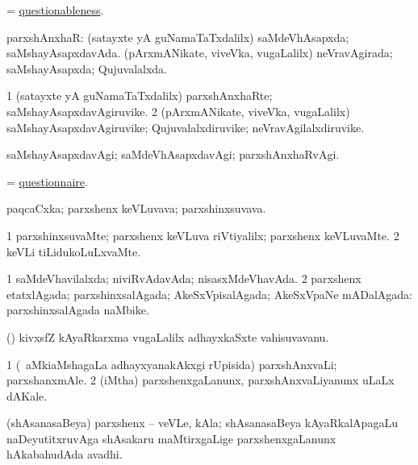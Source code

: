 \bentry
{}
\gl{\nA}
\bmng
= \hyperlink{questionableness}{questionableness}. 
\emng
\eentry

\bentry
{}
\gl{\gu}
\bmng
parxshAnxhaR: 
\banum
{} (satayxte yA guNamaTaTxdalilx) saMdeVhAsapxda; saMshayAsapxdavAda. 
 (pArxmANikate, viveVka, \mo vugaLalilx) neVravAgirada; saMshayAsapxda; Qujuvalalxda. 
\eanum
\emng
\eentry

\bentry
{}
\gl{\nA}
\bmng
\bnum
\num{1} (satayxte yA guNamaTaTxdalilx) parxshAnxhaRte; saMshayAsapxdavAgiruvike. 
\num{2} (pArxmANikate, viveVka, \mo vugaLalilx) saMshayAsapxdavAgiruvike; Qujuvalalxdiruvike; neVravAgilalxdiruvike. 
\enum
\emng
\eentry

\bentry
{}
\gl{\kirxvi}
\bmng
saMshayAsapxdavAgi; saMdeVhAsapxdavAgi; parxshAnxhaRvAgi. 
\emng
\eentry

\bentry
{}
\gl{\nA}
\bmng
= \hyperlink{questionnaire}{questionnaire}. 
\emng
\eentry

\bentry
{}
\gl{\nA}
\bmng
paqcaCxka; parxshenx keVLuvava; parxshinxsuvava. 
\emng
\eentry

\bentry
{}
\gl{\kirxvi}
\bmng
\bnum
\num{1} parxshinxsuvaMte; parxshenx keVLuva riVtiyalilx; parxshenx keVLuvaMte. 
\num{2} keVLi tiLidukoLuLxvaMte. 
\enum
\emng
\eentry

\bentry
{}
\gl{\gu}
\bmng
\bnum
\num{1} saMdeVhavilalxda; niviRvAdavAda; nisasxMdeVhavAda. 
\num{2} parxshenx etatxlAgada; parxshinxsalAgada; AkeSxVpisalAgada; AkeSxVpaNe mADalAgada:   parxshinxsalAgada naMbike. 
\enum
\emng
\eentry

\bentry
{}
\gl{\nA}
\bmng
(\birx) kivxsfZ kAyaRkarxma \mo vugaLalilx adhayxkaSxte vahisuvavanu. 
\emng
\eentry

\bentry
{}
\gl{\nA}
\bmng
\bnum
\num{1} (\kanmu\ aMkiaMshagaLa adhayxyanakAkxgi rUpisida) parxshAnxvaLi; parxshanxmAle. 
\num{2} (iMtha) parxshenxgaLanunx, parxshAnxvaLiyanunx uLaLx dAKale. 
\enum
\emng
\eentry

\bentry
{}
\gl{\nA}
\bmng
(shAsanasaBeya) parxshenx -- veVLe, kAla; shAsanasaBeya kAyaRkalApagaLu naDeyutitxruvAga shAsakaru maMtirxgaLige parxshenxgaLanunx hAkabahudAda avadhi. 
\emng
\eentry


